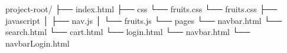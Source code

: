 project-root/
├── index.html
├── css
  └── fruits.css  └── fruits.css
├── javascript
│   ├── nav.js
│   └── fruits.js
└── pages
    └── navbar.html
    └── search.html
    └── cart.html
    └── login.html
    └── navbar.html
    └── navbarLogin.html

